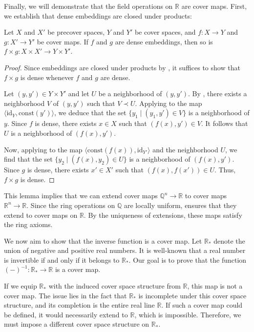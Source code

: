 \documentclass[reqno]{amsart}
\theoremstyle{definition}
\theoremstyle{remark}
\numberwithin{figure}{section}
\newcommand{\rb}{\prec}
\begin{document}
Finally, we will demonstrate that the field operations on $\mathbb{R}$ are cover maps.
First, we establish that dense embeddings are closed under products:

\begin{lem}
Let $X$ and $X'$ be precover spaces, $Y$ and $Y'$ be cover spaces, and $f : X \to Y$ and $g : X' \to Y'$ be cover maps.
If $f$ and $g$ are dense embeddings, then so is $f \times g : X \times X' \to Y \times Y'$.
\end{lem}
\begin{proof}
Since embeddings are closed under products by , it suffices to show that $f \times g$ is dense whenever $f$ and $g$ are dense.

Let $(y,y') \in Y \times Y'$ and let $U$ be a neighborhood of $(y,y')$.
By , there exists a neighborhood $V$ of $(y,y')$ such that $V \rb U$.
Applying  to the map $\langle \mathrm{id}_Y, \mathrm{const}(y') \rangle$, we deduce that the set $\{ y_1 \mid (y_1,y') \in V \}$ is a neighborhood of $y$.
Since $f$ is dense, there exists $x \in X$ such that $(f(x),y') \in V$.
It follows that $U$ is a neighborhood of $(f(x),y')$.

Now, applying  to the map $\langle \mathrm{const}(f(x)), \mathrm{id}_{Y'} \rangle$ and the neighborhood $U$,
we find that the set $\{ y_2 \mid (f(x),y_2) \in U \}$ is a neighborhood of $(f(x),y')$.
Since $g$ is dense, there exists $x' \in X'$ such that $(f(x),f(x')) \in U$.
Thus, $f \times g$ is dense.
\end{proof}

This lemma implies that we can extend cover maps $\mathbb{Q}^n \to \mathbb{R}$ to cover maps $\mathbb{R}^n \to \mathbb{R}$.
Since the ring operations on $\mathbb{Q}$ are locally uniform,  ensures that they extend to cover maps on $\mathbb{R}$.
By the uniqueness of extensions, these maps satisfy the ring axioms.

We now aim to show that the inverse function is a cover map.
Let $\mathbb{R}_*$ denote the union of negative and positive real numbers.
It is well-known that a real number is invertible if and only if it belongs to $\mathbb{R}_*$.
Our goal is to prove that the function $(-)^{-1} : \mathbb{R}_* \to \mathbb{R}$ is a cover map.

If we equip $\mathbb{R}_*$ with the induced cover space structure from $\mathbb{R}$, this map is not a cover map.
The issue lies in the fact that $\mathbb{R}_*$ is incomplete under this cover space structure, and its completion is the entire real line $\mathbb{R}$.
If such a cover map could be defined, it would necessarily extend to $\mathbb{R}$, which is impossible.
Therefore, we must impose a different cover space structure on $\mathbb{R}_*$.
\end{document}
